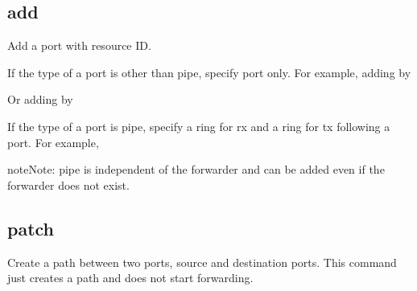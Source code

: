 \documentclass[a4paper,11pt,openany,oneside,english]{sphinxmanual}
\begin{document}
\begin{sphinxVerbatim}[commandchars=\\\{\},formatcom=\footnotesize]
\end{sphinxVerbatim}


\subsection{add}
\label{\detokenize{commands/primary:add}}\label{\detokenize{commands/primary:commands-primary-add}}
Add a port with resource ID.

If the type of a port is other than pipe, specify port only.
For example, adding  by

\begin{sphinxVerbatim}[commandchars=\\\{\},formatcom=\footnotesize]
\end{sphinxVerbatim}

Or adding  by

\begin{sphinxVerbatim}[commandchars=\\\{\},formatcom=\footnotesize]
\end{sphinxVerbatim}

If the type of a port is pipe, specify a ring for rx and a ring
for tx following a port. For example,

\begin{sphinxVerbatim}[commandchars=\\\{\},formatcom=\footnotesize]
\end{sphinxVerbatim}

\begin{sphinxadmonition}{note}{Note:}
pipe is independent of the forwarder and can be added even if the
forwarder does not exist.
\end{sphinxadmonition}


\subsection{patch}
\label{\detokenize{commands/primary:patch}}\label{\detokenize{commands/primary:commands-primary-patch}}
Create a path between two ports, source and destination ports.
This command just creates a path and does not start forwarding.
\end{document}
